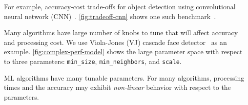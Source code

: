 For example, accuracy-cost trade-offs for object detection using convolutional
neural network (CNN)~\cite{huang2016speed}. \autoref{fig:tradeoff-cnn} shows one
such benchmark~\cite{cnn.benchmarks}.

Many algorithms have large number of knobs to tune that will affect accuracy and
processing cost. We use Viola-Jones (VJ) cascade face
detector~\cite{viola2001rapid} as an example. \autoref{fig:complex-perf-model}
shows the large parameter space with respect to three parameters:
\texttt{min\_size}, \texttt{min\_neighbors}, and \texttt{scale}.

ML algorithms have many tunable parameters. For many algorithms, processing
times and the accuracy may exhibit \textit{non-linear} behavior with respect to
the parameters.

